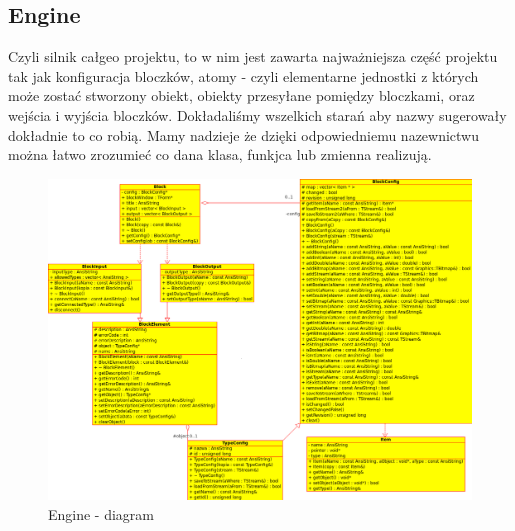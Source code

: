 \subsection{Engine}
Czyli silnik całgeo projektu, to w nim jest zawarta najważniejsza część projektu tak jak konfiguracja bloczków, atomy - czyli elementarne jednostki z których może zostać stworzony obiekt, obiekty przesyłane pomiędzy bloczkami, oraz wejścia i wyjścia bloczków.
Dokładaliśmy wszelkich starań aby nazwy sugerowały dokładnie to co robią. Mamy nadzieje że dzięki odpowiedniemu nazewnictwu można łatwo zrozumieć co dana klasa, funkjca lub zmienna realizują.
\begin{figure}[h]
 \centering
 \includegraphics[scale=0.4]{diagram-engine.png}
 \caption{Engine - diagram}
 \label{fig:engine}
\end{figure}
\newpage
